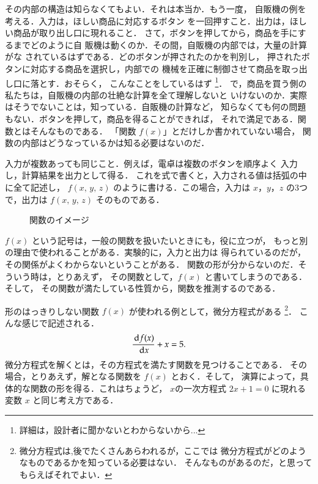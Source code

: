    その内部の構造は知らなくてもよい．それは本当か．もう一度，
    自販機の例を考える．入力は，ほしい商品に対応するボタン
    を一回押すこと．出力は，ほしい商品が取り出し口に現れること．
    さて，ボタンを押してから，商品を手にするまでどのように自
    販機は動くのか．その間，自販機の内部では，大量の計算がな
    されているはずである．どのボタンが押されたのかを判別し，
    押されたボタンに対応する商品を選択し，内部での
    機械を正確に制御させて商品を取っ出し口に落とす．おそらく，
    こんなことをしているはず
        \footnote{
            詳細は，設計者に聞かないとわからないから...
        }．
    で，商品を買う側の私たちは，自販機の内部の壮絶な計算を全て理解しないと
    いけないのか．実際はそうでないことは，知っている．自販機の計算など，
    知らなくても何の問題もない．ボタンを押して，商品を得ることができれば，
    それで満足である．関数とはそんなものである．
    「関数 $f(x)$」とだけしか書かれていない場合，
    関数の内部はどうなっているかは知る必要はないのだ．

    入力が複数あっても同じこと．例えば，電卓は複数のボタンを順序よく
    入力し，計算結果を出力として得る．
    これを式で書くと，入力される値は括弧の中に全て記述し，
    $f(x,\,y,\,z)$ のように書ける．この場合，入力は
    $x$，$y$，$z$ の3つで，出力は $f(x,\,y,\,z)$ そのものである．

        \begin{figure}[hbt]
            \begin{center}
                \caption{関数のイメージ}
                \label{fig:kansuutoha}
            \end{center}
        \end{figure}

    $f(x)$ という記号は，一般の関数を扱いたいときにも，役に立つが，
    もっと別の理由で使われることがある．実験的に，入力と出力は
    得られているのだが，その関係がよくわからないということがある．
    関数の形が分からないのだ．そういう時は，とりあえず，
    その関数として，$f(x)$ と書いてしまうのである．そして，
    その関数が満たしている性質から，関数を推測するのである．

    形のはっきりしない関数 $f(x)$ が使われる例として，微分方程式がある
        \footnote{
            微分方程式は,後でたくさんあらわれるが，ここでは
            微分方程式がどのようなものであるかを知っている必要はない．
            そんなものがあるのだ，と思ってもらえばそれでよい．
        }．
    こんな感じで記述される．
        \begin{equation*}
            \frac{\,\mathrm{d} f(x)}{\,\mathrm{d} x} + x = 5.
        \end{equation*}
    微分方程式を解くとは，その方程式を満たす関数を見つけることである．
    その場合，とりあえず，解となる関数を $f(x)$ とおく．そして，
    演算によって，具体的な関数の形を得る．これはちょうど，
    $x$の一次方程式 $2x+1=0$ に現れる変数 $x$ と同じ考え方である．

